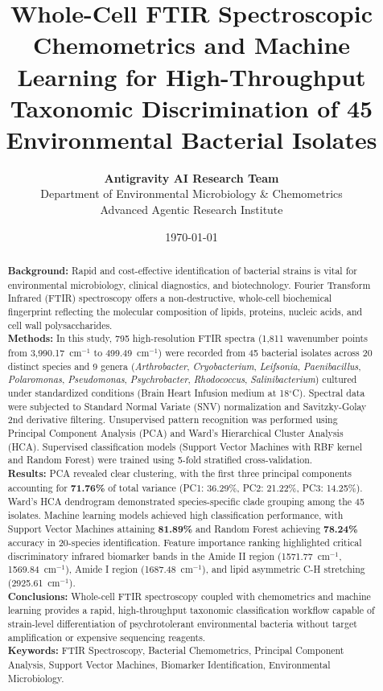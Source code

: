 \documentclass[11pt,a4paper]{article}
\title{\textbf{Whole-Cell FTIR Spectroscopic Chemometrics and Machine Learning for High-Throughput Taxonomic Discrimination of 45 Environmental Bacterial Isolates}}
\author{
    \textbf{Antigravity AI Research Team}\\[0.5em]
    \small Department of Environmental Microbiology \& Chemometrics\\
    \small Advanced Agentic Research Institute
}
\date{\today}
\begin{document}
\maketitle

\begin{abstract}
\noindent \textbf{Background:} Rapid and cost-effective identification of bacterial strains is vital for environmental microbiology, clinical diagnostics, and biotechnology. Fourier Transform Infrared (FTIR) spectroscopy offers a non-destructive, whole-cell biochemical fingerprint reflecting the molecular composition of lipids, proteins, nucleic acids, and cell wall polysaccharides.\\[0.5em]
\noindent \textbf{Methods:} In this study, 795 high-resolution FTIR spectra (1,811 wavenumber points from 3,990.17~cm$^{-1}$ to 499.49~cm$^{-1}$) were recorded from 45 bacterial isolates across 20 distinct species and 9 genera (\textit{Arthrobacter}, \textit{Cryobacterium}, \textit{Leifsonia}, \textit{Paenibacillus}, \textit{Polaromonas}, \textit{Pseudomonas}, \textit{Psychrobacter}, \textit{Rhodococcus}, \textit{Salinibacterium}) cultured under standardized conditions (Brain Heart Infusion medium at 18$^\circ$C). Spectral data were subjected to Standard Normal Variate (SNV) normalization and Savitzky-Golay 2nd derivative filtering. Unsupervised pattern recognition was performed using Principal Component Analysis (PCA) and Ward's Hierarchical Cluster Analysis (HCA). Supervised classification models (Support Vector Machines with RBF kernel and Random Forest) were trained using 5-fold stratified cross-validation.\\[0.5em]
\noindent \textbf{Results:} PCA revealed clear clustering, with the first three principal components accounting for \textbf{71.76\%} of total variance (PC1: 36.29\%, PC2: 21.22\%, PC3: 14.25\%). Ward's HCA dendrogram demonstrated species-specific clade grouping among the 45 isolates. Machine learning models achieved high classification performance, with Support Vector Machines attaining \textbf{81.89\%} and Random Forest achieving \textbf{78.24\%} accuracy in 20-species identification. Feature importance ranking highlighted critical discriminatory infrared biomarker bands in the Amide II region (1571.77~cm$^{-1}$, 1569.84~cm$^{-1}$), Amide I region (1687.48~cm$^{-1}$), and lipid asymmetric C-H stretching (2925.61~cm$^{-1}$).\\[0.5em]
\noindent \textbf{Conclusions:} Whole-cell FTIR spectroscopy coupled with chemometrics and machine learning provides a rapid, high-throughput taxonomic classification workflow capable of strain-level differentiation of psychrotolerant environmental bacteria without target amplification or expensive sequencing reagents.\\[0.5em]
\noindent \textbf{Keywords:} FTIR Spectroscopy, Bacterial Chemometrics, Principal Component Analysis, Support Vector Machines, Biomarker Identification, Environmental Microbiology.
\end{abstract}
\end{document}
